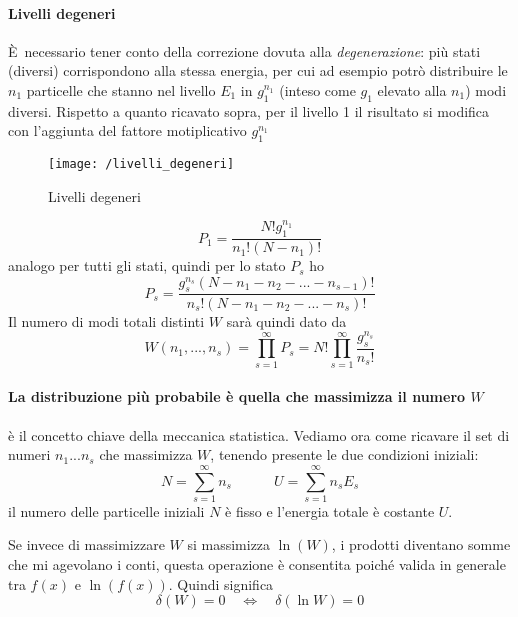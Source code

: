 \paragraph{Livelli degeneri}
È necessario tener conto della correzione dovuta alla \textit{degenerazione}: più stati (diversi) corrispondono alla stessa energia, per cui ad esempio potrò distribuire le $n_1$ particelle che stanno nel livello $E_1$ in $g_1^{n_1}$ (inteso come $g_1$ elevato alla $n_1$) modi diversi.
Rispetto a quanto ricavato sopra, per il livello 1 il risultato si modifica con l'aggiunta del fattore motiplicativo $g_1^{n_1}$
\begin{figure}[h]
\centering
\texttt{[image: /livelli\_degeneri]}
\caption{Livelli degeneri}
\label{esempio_partizione}
\end{figure}
\begin{equation}
P_1 = \frac{ N! g_1^{n_1}}{n_1! (N-n_1)! }
\end{equation}
analogo per tutti gli stati, quindi per lo stato $P_s$ ho
\begin{equation}
P_s = \frac{g_s^{n_s}(N-n_1 - n_2 - ... - n_{s-1})!}{n_s! ( N - n_1 - n_2 - ... - n_{s})!}
\end{equation}
Il numero di modi totali distinti $W$ sarà quindi dato da
\begin{equation}
W(n_1,...,n_s) = \prod_{s=1}^{\infty} P_s = N! \prod_{s=1}^{\infty}\frac{ g_s^{n_s}}{ n_s!}
\end{equation}

\paragraph{La distribuzione più probabile è quella che massimizza il numero $W$} è il concetto chiave della meccanica statistica.
Vediamo ora come ricavare il set di numeri $n_1 ... n_s$ che massimizza $W$, tenendo presente le due condizioni iniziali: 
\begin{equation}
N  =  \sum_{s=1}^{\infty} n_s 
\quad\quad\quad
U =  \sum_{s=1}^{\infty} n_s E_s
\end{equation}
il numero delle particelle iniziali $N$ è fisso e l'energia totale è costante $U$.

Se invece di massimizzare $W$ si massimizza $\ln(W)$, i prodotti diventano somme che mi agevolano i conti, questa operazione è consentita poiché valida in generale tra $f(x)$ e $\ln(f(x))$.
Quindi significa
\begin{equation}
\delta ( W) = 0 \quad \Leftrightarrow  \quad \delta (\ln W) = 0
\end{equation}

